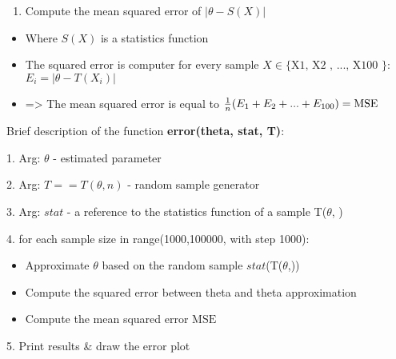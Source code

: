 \documentclass[11pt]{article}
\providecommand{\tightlist}{%
      \setlength{\itemsep}{0pt}\setlength{\parskip}{0pt}}
\begin{document}
\begin{enumerate}
\def\labelenumi{\arabic{enumi}.}
\tightlist
\item
  Compute the mean squared error of
  \(|\theta - S(X)|\)
\end{enumerate}

\begin{itemize}
\tightlist
\item
  Where \(S(X)\) is a statistics function
\item
  The squared error is computer for every sample
  \(X \in \text{\{ X1, X2 , ..., X100 \}}\): \(E_i = |\theta - T(X_i)|\)
\item
  =\textgreater{} The mean squared error is equal to
  \(\space\frac{1}{n}(E_1 + E_2 + ... + E_{100}) = \text{MSE}\)
\end{itemize}

    Brief description of the function \textbf{error(theta, stat, T)}: \newline

    1. Arg: \(\theta\) - estimated parameter \newline

    2. Arg: \(T == T(\theta,n)\) - random sample generator \newline

    3. Arg: \(\textit{stat}\) - a reference to the statistics function of a sample T(\(\theta\), ) \newline
    
    4. for each sample size in range(1000,100000, with step 1000): \newline
    \begin{itemize}
      \tightlist
    \item
      \space\space Approximate \(\theta\) based on the random sample \(\textit{stat}\)(T(\(\theta\),)) \newline
    \item
      \space\space Compute the squared error between theta and theta approximation \newline
    \item
      \space\space Compute the mean squared error \(\text{MSE}\) \newline
    \end{itemize}
    5. Print results \& draw the error plot \newline\newline\newline
\end{document}
